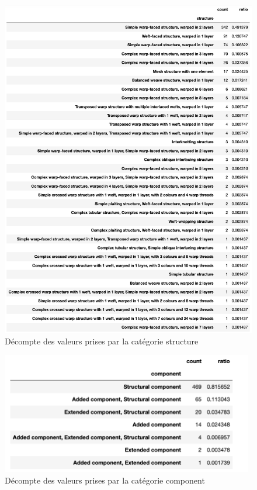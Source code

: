 \documentclass[a4paper, twoside]{book}
\begin{document}
\begin{figure}[!h]
        \begin{center}
        		\includegraphics[width=12cm]{../images/count_structure.png}
	\end{center}
    \caption{Décompte des valeurs prises par la catégorie \og structure\fg}     
    \label{fig:structure}
\end{figure}

\begin{figure}[!h]
        \begin{center}
        		\includegraphics[width=11cm]{../images/count_component.png}
	\end{center}
    \caption{Décompte des valeurs prises par la catégorie \og component\fg}     
    \label{fig:component}
\end{figure}
\end{document}
